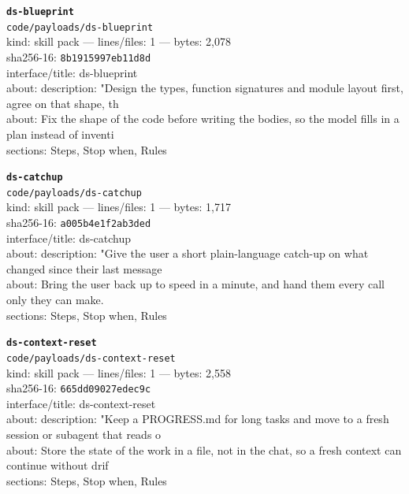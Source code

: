 \noindent\textbf{\texttt{ds-blueprint}}\\
\texttt{code/payloads/ds-blueprint}\\
kind: skill pack --- lines/files: 1 --- bytes: 2,078\\
sha256-16: \texttt{8b1915997eb11d8d}\\
interface/title: ds-blueprint\\
about: description: "Design the types, function signatures and module layout first, agree on that shape, th\\
about: Fix the shape of the code before writing the bodies, so the model fills in a plan instead of inventi\\
sections: Steps, Stop when, Rules\\
\vspace*{6.0pt}

\noindent\textbf{\texttt{ds-catchup}}\\
\texttt{code/payloads/ds-catchup}\\
kind: skill pack --- lines/files: 1 --- bytes: 1,717\\
sha256-16: \texttt{a005b4e1f2ab3ded}\\
interface/title: ds-catchup\\
about: description: "Give the user a short plain-language catch-up on what changed since their last message\\
about: Bring the user back up to speed in a minute, and hand them every call only they can make.\\
sections: Steps, Stop when, Rules\\
\vspace*{6.0pt}

\noindent\textbf{\texttt{ds-context-reset}}\\
\texttt{code/payloads/ds-context-reset}\\
kind: skill pack --- lines/files: 1 --- bytes: 2,558\\
sha256-16: \texttt{665dd09027edec9c}\\
interface/title: ds-context-reset\\
about: description: "Keep a PROGRESS.md for long tasks and move to a fresh session or subagent that reads o\\
about: Store the state of the work in a file, not in the chat, so a fresh context can continue without drif\\
sections: Steps, Stop when, Rules\\
\vspace*{6.0pt}
\newpage

